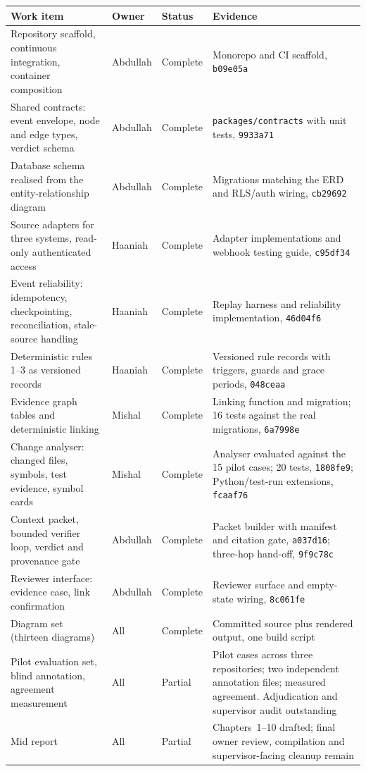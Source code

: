 \begin{longtable}{>{\raggedright\arraybackslash}p{}>{\raggedright\arraybackslash}p{}>{\raggedright\arraybackslash}p{}>{\raggedright\arraybackslash}p{}}
\toprule
Work item & Owner & Status & Evidence \\
\midrule
\endhead
Repository scaffold, continuous integration, container composition
  & Abdullah & Complete & Monorepo and CI scaffold, \texttt{b09e05a} \\
Shared contracts: event envelope, node and edge types, verdict schema
  & Abdullah & Complete & \texttt{packages/contracts} with unit tests, \texttt{9933a71} \\
Database schema realised from the entity-relationship diagram
  & Abdullah & Complete & Migrations matching the ERD and RLS/auth wiring, \texttt{cb29692} \\
Source adapters for three systems, read-only authenticated access
  & Haaniah & Complete & Adapter implementations and webhook testing guide, \texttt{c95df34} \\
Event reliability: idempotency, checkpointing, reconciliation, stale-source
  handling
  & Haaniah & Complete & Replay harness and reliability implementation, \texttt{46d04f6} \\
Deterministic rules 1--3 as versioned records
  & Haaniah & Complete & Versioned rule records with triggers, guards and grace
    periods, \texttt{048ceaa} \\
Evidence graph tables and deterministic linking
  & Mishal & Complete & Linking function and migration; 16 tests against the
    real migrations, \texttt{6a7998e} \\
Change analyser: changed files, symbols, test evidence, symbol cards
  & Mishal & Complete & Analyser evaluated against the 15 pilot cases;
    20 tests, \texttt{1808fe9}; Python/test-run extensions, \texttt{fcaaf76} \\
Context packet, bounded verifier loop, verdict and provenance gate
  & Abdullah & Complete & Packet builder with manifest and citation gate,
    \texttt{a037d16}; three-hop hand-off, \texttt{9f9c78c} \\
Reviewer interface: evidence case, link confirmation
  & Abdullah & Complete & Reviewer surface and empty-state wiring, \texttt{8c061fe} \\
Diagram set (thirteen diagrams)
  & All & Complete & Committed source plus rendered output, one build script \\
Pilot evaluation set, blind annotation, agreement measurement
  & All & Partial & Pilot cases across three repositories; two independent
    annotation files; measured agreement. Adjudication and supervisor audit
    outstanding \\
Mid report
  & All & Partial & Chapters~1--10 drafted; final owner review, compilation and
    supervisor-facing cleanup remain \\
\bottomrule
\end{longtable}

